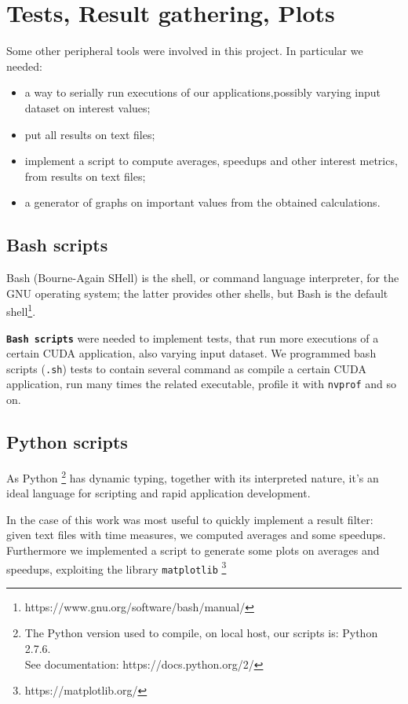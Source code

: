 \section{Tests, Result gathering, Plots}
Some other peripheral tools were involved in this project.
In particular we needed:
\begin{itemize}
	\item a way to serially run executions of our applications,possibly varying input dataset on interest values;
	\item put all results on text files;
	\item implement a script to compute averages, speedups and other interest metrics, from results on text files;
	\item a generator of graphs on important values from the obtained calculations.
\end{itemize}

\subsection{Bash scripts}
Bash (Bourne-Again SHell) is the shell, or command language interpreter, for the GNU operating system; the latter provides other shells, but Bash is the default  shell\footnote{https://www.gnu.org/software/bash/manual/}. 

\textbf{\texttt{Bash scripts}} were needed to implement tests, that run more executions of a certain CUDA application, also varying input dataset.
We programmed bash scripts (\texttt{.sh}) tests to contain several command as compile a certain CUDA application, run many times the related executable, profile it with \texttt{nvprof} and so on.

\subsection{Python scripts}
As Python \footnote{The Python version used to compile, on local host, our scripts is: Python 2.7.6.\\ See documentation: https://docs.python.org/2/} has dynamic typing, together with its interpreted nature, it's an ideal language for scripting and rapid application development.

In the case of this work was most useful to quickly implement a result filter: given text files with time measures, we computed averages and some speedups. \\
Furthermore we implemented a script to generate some plots on averages and speedups, exploiting the library \texttt{matplotlib} \footnote{https://matplotlib.org/}





